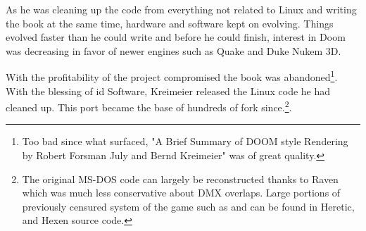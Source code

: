 \par
 As he was cleaning up the code from everything not related to Linux and writing the book at the same time, hardware and software kept on evolving. Things evolved faster than he could write and before he could finish, interest in Doom was decreasing in favor of newer engines such as Quake and Duke Nukem 3D.\\
 \par
  With the profitability of the project compromised the book was abandoned\footnote{Too bad since what surfaced, "A Brief Summary of DOOM style Rendering by Robert Forsman July and Bernd Kreimeier" was of great quality.}. With the blessing of id Software, Kreimeier released the Linux code he had cleaned up. This port became the base of hundreds of fork since.\footnote{The original MS-DOS code can largely be reconstructed thanks to Raven which was much less conservative about DMX overlaps. Large portions of previously censured system of the game such as  and  can be found in Heretic, and Hexen source code.}.\\
 \par  


